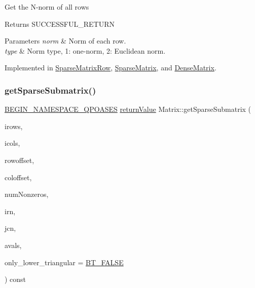 Get the N-\/norm of all rows \begin{DoxyReturn}{Returns}
S\+U\+C\+C\+E\+S\+S\+F\+U\+L\+\_\+\+R\+E\+T\+U\+RN 
\end{DoxyReturn}

\begin{DoxyParams}{Parameters}
{\em norm} & Norm of each row. \\
\hline
{\em type} & Norm type, 1\+: one-\/norm, 2\+: Euclidean norm. \\
\hline
\end{DoxyParams}


Implemented in \hyperlink{class_sparse_matrix_row_ab4ee9b14df2b9272aa2dbedccf53efc3}{Sparse\+Matrix\+Row}, \hyperlink{class_sparse_matrix_aec5a39697ccc13df99551bdc79e93c7f}{Sparse\+Matrix}, and \hyperlink{class_dense_matrix_a1d3faae6ae439acdb478a6ca8a67e776}{Dense\+Matrix}.

\mbox{\label{class_matrix_ada03b5778cd258a0d74d724e034407c3}} 
\subsubsection{\texorpdfstring{get\+Sparse\+Submatrix()}{getSparseSubmatrix()}\hspace{0.1cm}{\footnotesize\ttfamily [1/4]}}
{\footnotesize\ttfamily \hyperlink{_types_8hpp_afd127fcb3c8f47975e9fa0ec2bacde52}{B\+E\+G\+I\+N\+\_\+\+N\+A\+M\+E\+S\+P\+A\+C\+E\+\_\+\+Q\+P\+O\+A\+S\+ES} \hyperlink{_message_handling_8hpp_a81d556f613bfbabd0b1f9488c0fa865e}{return\+Value} Matrix\+::get\+Sparse\+Submatrix (\begin{DoxyParamCaption}\item[{const \hyperlink{class_indexlist}{Indexlist} $\ast$const}]{irows,  }\item[{const \hyperlink{class_indexlist}{Indexlist} $\ast$const}]{icols,  }\item[{\hyperlink{_types_8hpp_ab6fd6105e64ed14a0c9281326f05e623}{int\+\_\+t}}]{rowoffset,  }\item[{\hyperlink{_types_8hpp_ab6fd6105e64ed14a0c9281326f05e623}{int\+\_\+t}}]{coloffset,  }\item[{\hyperlink{_types_8hpp_ab6fd6105e64ed14a0c9281326f05e623}{int\+\_\+t} \&}]{num\+Nonzeros,  }\item[{\hyperlink{_types_8hpp_ab6fd6105e64ed14a0c9281326f05e623}{int\+\_\+t} $\ast$}]{irn,  }\item[{\hyperlink{_types_8hpp_ab6fd6105e64ed14a0c9281326f05e623}{int\+\_\+t} $\ast$}]{jcn,  }\item[{\hyperlink{qp_o_a_s_e_s__wrapper_8h_a0d00e2b3dfadee81331bbb39068570c4}{real\+\_\+t} $\ast$}]{avals,  }\item[{\hyperlink{_types_8hpp_a20f82124c82b6f5686a7fce454ef9089}{Boolean\+Type}}]{only\+\_\+lower\+\_\+triangular = {\ttfamily \hyperlink{_types_8hpp_a20f82124c82b6f5686a7fce454ef9089a85b8a20e72a8bea5dd10a6007fe3071e}{B\+T\+\_\+\+F\+A\+L\+SE}} }\end{DoxyParamCaption}) const\hspace{0.3cm}{\ttfamily [virtual]}}

